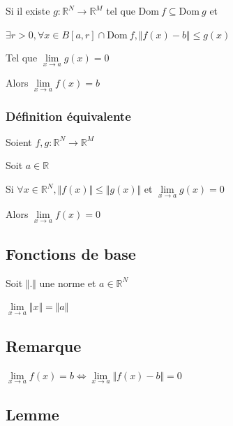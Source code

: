 \documentclass[a4paper,10pt]{article}
\newcommand{\ap}{\rightarrow}
\newcommand{\Dom}{\mathrm{Dom}\:}
\newcommand{\R}{\mathbb{R}}
\newcommand{\ioi}{\Leftrightarrow}
\newcommand{\clim}[1]{\lim\limits_{#1}}
\begin{document}
Si il existe $g : \R^N \ap \R^M$ tel que $\Dom f \subseteq \Dom g$ et

$\exists r > 0, \forall x \in B[a,r] \cap \Dom f, \Vert f(x) - b \Vert \leq g(x)$

Tel que $\lim\limits_{x \ap a} g(x) = 0$

Alors $\lim\limits_{x \ap a} f(x) = b$

\subsubsection{Définition équivalente}

Soient $f,g : \R^N \ap \R^M$

Soit $a \in \R$

Si $\forall x \in \R^N, \Vert f(x) \Vert \leq \Vert g(x) \Vert$ et $\clim{x \ap a} g(x) = 0$

Alors $\clim{x \ap a} f(x) = 0$







\subsection{Fonctions de base}

Soit $\Vert. \Vert$ une norme et $a \in \R^N$

$\lim\limits_{x \ap a} \Vert x \Vert = \Vert a \Vert$

\subsection{Remarque}

$\clim{x\ap a} f(x) = b \ioi \clim{x \ap a} \Vert f(x)-b \Vert = 0$

\subsection{Lemme}
\end{document}
